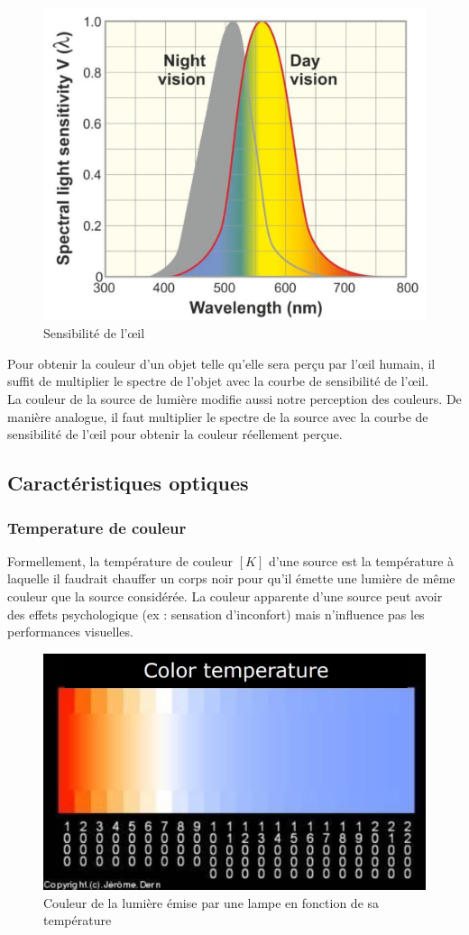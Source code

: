 \documentclass[11pt]{report}
\begin{document}
\begin{figure}[h]
\centering
\includegraphics[width=0.4\linewidth]{vision}
\caption{Sensibilité de l'œil }
\label{vis}
\end{figure}

Pour obtenir la couleur d'un objet telle qu'elle sera perçu par l'œil humain, il suffit de multiplier le spectre de l'objet avec la courbe de sensibilité de l'œil.\\

La couleur de la source de lumière modifie aussi notre perception des couleurs. De manière analogue, il faut multiplier le spectre de la source avec la courbe de sensibilité de l'œil pour obtenir la couleur réellement perçue.





\newpage
\subsection{Caractéristiques optiques}
\subsubsection{Temperature de couleur}
Formellement, la température de couleur $[K]$ d'une source est la température à laquelle il faudrait chauffer un corps noir pour qu'il émette une lumière de même couleur que la source considérée.
La couleur apparente d'une source peut avoir des effets psychologique (ex : sensation d'inconfort) mais n'influence pas les performances visuelles.

\begin{figure}[h]
\centering
\includegraphics[width=0.4\linewidth]{temp}
\caption{Couleur de la lumière émise par une lampe en fonction de sa température}
\end{figure}
\end{document}
